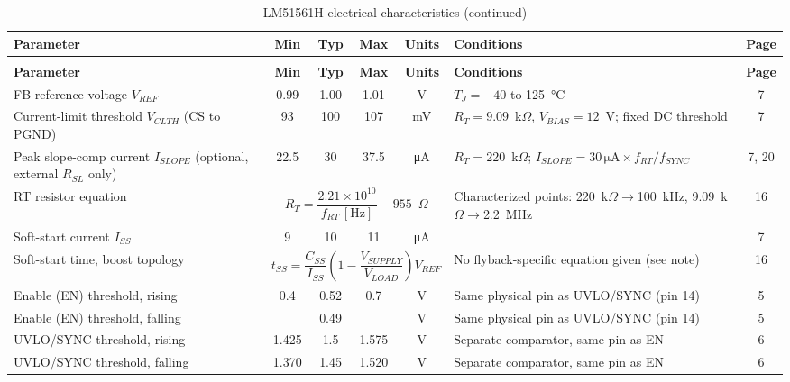 {\footnotesize
\begin{longtable}{|L{4.4cm}|c|c|c|c|L{3.8cm}|c|}
\caption{LM51561H electrical characteristics}\label{tab:lm5156h}\\
\hline
\textbf{Parameter} & \textbf{Min} & \textbf{Typ} & \textbf{Max} & \textbf{Units} & \textbf{Conditions} & \textbf{Page} \\
\hline
\endfirsthead
\caption[]{LM51561H electrical characteristics (continued)}\\
\hline
\textbf{Parameter} & \textbf{Min} & \textbf{Typ} & \textbf{Max} & \textbf{Units} & \textbf{Conditions} & \textbf{Page} \\
\hline
\endhead
FB reference voltage \(V_{REF}\) & \num{0.99} & \num{1.00} & \num{1.01} & \si{\volt} & \(T_J=-40\) to \SI{125}{\celsius} & 7 \\
\hline
Current-limit threshold \(V_{CLTH}\) (CS to PGND) & \num{93} & \num{100} & \num{107} & \si{\milli\volt} & \(R_T=9.09\)~k\(\Omega\), \(V_{BIAS}=12\)~V; fixed DC threshold & 7 \\
\hline
Peak slope-comp current \(I_{SLOPE}\) (optional, external \(R_{SL}\) only) & \num{22.5} & \num{30} & \num{37.5} & \si{\micro\ampere} & \(R_T=220\)~k\(\Omega\); \(I_{SLOPE}=30\,\si{\micro\ampere}\times f_{RT}/f_{SYNC}\) & 7, 20 \\
\hline
RT resistor equation &  & Characterized points: 220~k\(\Omega\)\(\to\)100~kHz, 9.09~k\(\Omega\)\(\to\)2.2~MHz & 16 \\
\hline
Soft-start current \(I_{SS}\) & \num{9} & \num{10} & \num{11} & \si{\micro\ampere} & & 7 \\
\hline
Soft-start time, boost topology &  & No flyback-specific equation given (see note) & 16 \\
\hline
Enable (EN) threshold, rising & \num{0.4} & \num{0.52} & \num{0.7} & \si{\volt} & Same physical pin as UVLO/SYNC (pin 14) & 5 \\
\hline
Enable (EN) threshold, falling & & \num{0.49} & & \si{\volt} & Same physical pin as UVLO/SYNC (pin 14) & 5 \\
\hline
UVLO/SYNC threshold, rising & \num{1.425} & \num{1.5} & \num{1.575} & \si{\volt} & Separate comparator, same pin as EN & 6 \\
\hline
UVLO/SYNC threshold, falling & \num{1.370} & \num{1.45} & \num{1.520} & \si{\volt} & Separate comparator, same pin as EN & 6 \\

\end{longtable}}

